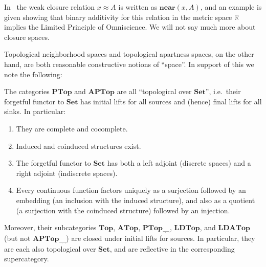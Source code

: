 \documentclass{article}
\def\R{\mathbb{R}}
\def\nn{\ensuremath{\neg\neg}}
\def\Set{\mathbf{Set}}
\def\PTop{\mathbf{PTop}}
\def\Top{\mathbf{Top}}
\def\PTopnn{\mathbf{PTop}_{\nn}}
\def\LDTop{\mathbf{LDTop}}
\def\APTop{\mathbf{APTop}}
\def\ATop{\mathbf{ATop}}
\def\APTopnn{\mathbf{APTop}_{\nn}}
\def\LDATop{\mathbf{LDATop}}
\begin{document}
In~\cite{bridges-vita} the weak closure relation $x\approx A$ is written as $\mathbf{near}(x,A)$, and an example is given showing that binary additivity for this relation in the metric space $\R$ implies the Limited Principle of Omniscience.
We will not say much more about closure spaces.

Topological neighborhood spaces and topological apartness spaces, on the other hand, are both reasonable constructive notions of ``space''.
In support of this we note the following:

\begin{thm}\label{thm:top-topconcrete}
  The categories $\PTop$ and $\APTop$ are all ``topological over $\Set$'', i.e.\ their forgetful functor to $\Set$ has initial lifts for all sources and (hence) final lifts for all sinks.
  In particular:
  \begin{enumerate}
  \item They are complete and cocomplete.
  \item Induced and coinduced structures exist.
  \item The forgetful functor to $\Set$ has both a left adjoint (discrete spaces) and a right adjoint (indiscrete spaces).
  \item Every continuous function factors uniquely as a surjection followed by an embedding (an inclusion with the induced structure), and also as a quotient (a surjection with the coinduced structure) followed by an injection.
  \end{enumerate}
  Moreover, their subcategories $\Top$, $\ATop$, $\PTopnn$, $\LDTop$, and $\LDATop$ (but not $\APTopnn$) are closed under initial lifts for sources.
  In particular, they are each also topological over $\Set$, and are reflective in the corresponding supercategory.
\end{thm}
\end{document}
